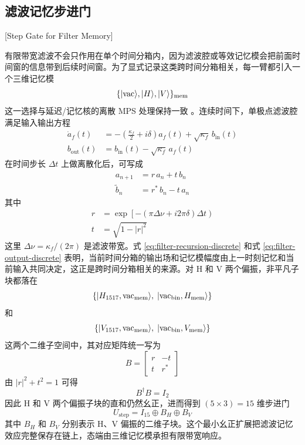 \subsection{滤波记忆步进门}[Step Gate for Filter Memory]

有限带宽滤波不会只作用在单个时间分箱内，因为滤波腔或等效记忆模会把前面时间窗的信息带到后续时间窗。为了显式记录这类跨时间分箱相关，每一臂都引入一个三维记忆模
\begin{equation}
\{|{\rm vac}\rangle,|H\rangle,|V\rangle\}_{\rm mem}
\label{eq:memory-3d-basis}
\end{equation}
这一选择与延迟/记忆核的离散 MPS 处理保持一致 \cite{ArranzRegidor2021WaveguideQED,Pichler2016TimeDelaysMPS}。连续时间下，单极点滤波腔满足输入输出方程
\begin{align}
\dot a_f(t)&= -\left(\frac{\kappa_f}{2}+i\delta\right)a_f(t)+\sqrt{\kappa_f}\,b_{\mathrm{in}}(t)
\label{eq:filter-io-continuous}\\
b_{\mathrm{out}}(t)&=b_{\mathrm{in}}(t)-\sqrt{\kappa_f}\,a_f(t)
\label{eq:filter-output-continuous}
\end{align}
在时间步长 $\Delta t$ 上做离散化后，可写成
\begin{align}
a_{n+1}&=r\,a_n+t\,b_n
\label{eq:filter-recursion-discrete}\\
\tilde b_n&=r^*\,b_n-t\,a_n
\label{eq:filter-output-discrete}
\end{align}
其中
\begin{align}
r&=\exp\!\left[-(\pi\Delta\nu+i2\pi\delta)\Delta t\right)
\label{eq:filter-r}\\
t&=\sqrt{1-|r|^2}
\label{eq:filter-rt}
\end{align}
这里 $\Delta\nu=\kappa_f/(2\pi)$ 是滤波带宽。式 \eqref{eq:filter-recursion-discrete} 和式 \eqref{eq:filter-output-discrete} 表明，当前时间分箱的输出场和记忆模幅度由上一时刻记忆和当前输入共同决定，这正是跨时间分箱相关的来源。对 H 和 V 两个偏振，非平凡子块都落在
\begin{equation}
\{|H_{1517},{\rm vac}_{\rm mem}\rangle,\;|{\rm vac}_{\rm bin},H_{\rm mem}\rangle\}
\end{equation}
和
\begin{equation}
\{|V_{1517},{\rm vac}_{\rm mem}\rangle,\;|{\rm vac}_{\rm bin},V_{\rm mem}\rangle\}
\end{equation}
这两个二维子空间中，其对应矩阵统一写为
\begin{equation}
B=
\begin{bmatrix}
r&-t\\
t&r^*
\end{bmatrix}
\label{eq:filter-step-subblock}
\end{equation}
由 $|r|^2+t^2=1$ 可得
\begin{equation}
B^\dagger B=I_2
\end{equation}
因此 H 和 V 两个偏振子块的直和仍然幺正，进而得到 $(5\times3)=15$ 维步进门
\begin{equation}
U_{\mathrm{step}} = I_{15}\oplus B_H \oplus B_V
\label{eq:filter-step-tensor}
\end{equation}
其中 $B_H$ 和 $B_V$ 分别表示 H、V 偏振的二维子块。这个最小幺正扩展把滤波记忆效应完整保存在链上，态端由三维记忆模承担有限带宽响应。

